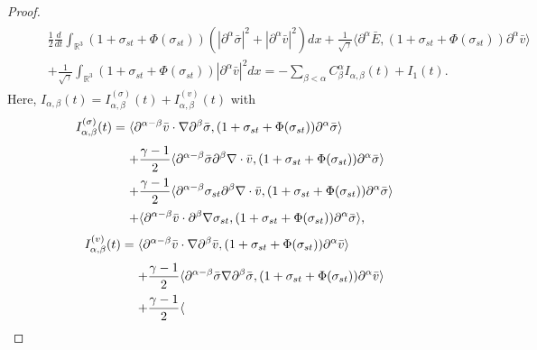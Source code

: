 \documentclass[11pt]{amsart}
\numberwithin{equation}{section}
\begin{document}
\begin{proof}
\begin{eqnarray}\label{3.4}
  && \begin{aligned}
   &\frac{1}{2}\frac{d}{dt}\int_{\mathbb{R}^3}(1+\sigma_{st}+\Phi(\sigma_{st}))
   (|\partial^{\alpha}\bar{\sigma}|^2+|\partial^{\alpha}\bar{v}|^2)dx+\frac{1}{\sqrt{\gamma}}
   \langle \partial^{\alpha}\bar{E},(1+\sigma_{st}+\Phi(\sigma_{st}))\partial^{\alpha}\bar{v}\rangle\\
   &+\frac{1}{\sqrt{\gamma}}\int_{\mathbb{R}^3}(1+\sigma_{st}+\Phi(\sigma_{st}))|\partial^{\alpha}\bar{v}|^{2}dx
   =-\sum_{\beta<\alpha}C^{\alpha}_{\beta}I_{\alpha,\beta}(t)+I_{1}(t).
 \end{aligned}
\end{eqnarray}
Here,
$I_{\alpha,\beta}(t)=I_{\alpha,\beta}^{(\sigma)}(t)+I_{\alpha,\beta}^{(v)}(t)$
with
\begin{eqnarray*}
\arraycolsep=1.5pt
\begin{array}{rl}
 \displaystyle
I_{\alpha,\beta}^{(\sigma)}(t)=& \displaystyle\langle
\partial^{\alpha-\beta}\bar{v} \cdot \nabla \partial^{\beta}\bar{\sigma},
(1+\sigma_{st}+\Phi(\sigma_{st}))\partial^{\alpha}\bar{\sigma}\rangle\\[3mm]
&\displaystyle+\frac{\gamma-1}{2}\langle\partial^{\alpha-\beta}\bar{\sigma}
\partial^{\beta}\nabla\cdot\bar{v} ,(1+\sigma_{st}+\Phi(\sigma_{st}))\partial^{\alpha}\bar{\sigma}\rangle\\[3mm]
 & \displaystyle+\frac{\gamma-1}{2}\langle
\partial^{\alpha-\beta}\sigma_{st}  \partial^{\beta}\nabla\cdot\bar{v} ,
(1+\sigma_{st}+\Phi(\sigma_{st}))\partial^{\alpha}\bar{\sigma}
\rangle\\[3mm]
& \displaystyle +\langle
\partial^{\alpha-\beta}\bar{v}\cdot \partial^{\beta}\nabla \sigma_{st} ,(1+\sigma_{st}+\Phi(\sigma_{st}))\partial^{\alpha}\bar{\sigma}\rangle,
 \end{array}
\end{eqnarray*}
\begin{eqnarray*}
\arraycolsep=1.5pt
\begin{array}{rl}
 \displaystyle
I_{\alpha,\beta}^{(v)}(t)=& \displaystyle\langle
\partial^{\alpha-\beta}\bar{v} \cdot \nabla \partial^{\beta}\bar{v} ,
(1+\sigma_{st}+\Phi(\sigma_{st}))\partial^{\alpha}\bar{v}\rangle\\[3mm]
&\displaystyle+\frac{\gamma-1}{2}\langle\partial^{\alpha-\beta}\bar{\sigma}
\nabla\partial^{\beta}\bar{\sigma},(1+\sigma_{st}+\Phi(\sigma_{st}))\partial^{\alpha}\bar{v}\rangle\\[3mm]
&\displaystyle+\frac{\gamma-1}{2}\langle

\end{array}
\end{eqnarray*}
\end{proof}
\end{document}
